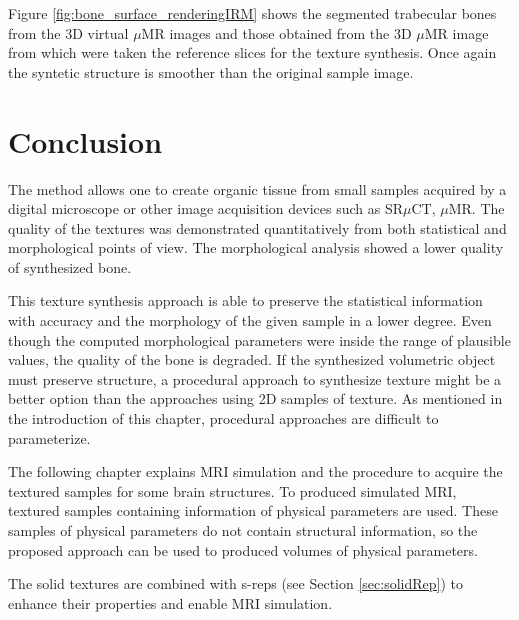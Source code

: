 Figure \ref{fig:bone_surface_renderingIRM} shows the segmented trabecular bones from the 3D virtual $\mu$MR images and those obtained from the 3D $\mu$MR image 
from which were taken the reference slices for the texture synthesis. 
Once again the syntetic structure is smoother than the original sample image.


\section{Conclusion}
\label{sec:Conclusions}

The method allows one to create organic tissue from small samples acquired by a digital microscope or
other image acquisition devices such as SR$\mu$CT, $\mu$MR. %
The quality of the textures was demonstrated 
quantitatively from both statistical and morphological points of view.
The morphological analysis showed a lower quality of synthesized bone.

This texture synthesis approach is able to preserve the statistical information 
with accuracy and the morphology of the given sample in a lower degree.
Even though the computed morphological parameters were 
inside the range of plausible values, the quality of the bone is degraded.  
If the synthesized volumetric object must preserve structure, a procedural approach 
to synthesize texture might be a better option than the approaches using 2D samples of texture.
As mentioned in the introduction of this chapter, procedural approaches are difficult to parameterize. 

The following chapter explains MRI simulation and
the procedure to acquire the textured samples 
for some brain structures. 
To produced simulated MRI, textured samples containing information of physical parameters are used.
These samples of physical parameters do not contain structural information, so 
the proposed approach can be used to produced volumes of physical parameters.

The solid textures are combined 
with s-reps (see Section \ref{sec:solidRep}) to enhance their properties 
and enable MRI simulation.


\newpage

